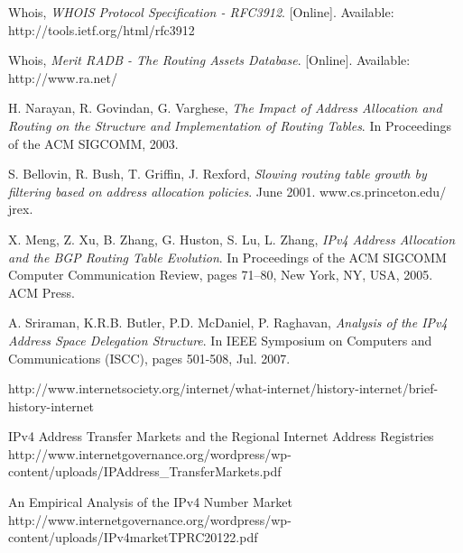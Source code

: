 \documentclass[11pt,a4paper]{scrreprt}
\begin{document}
\begin{thebibliography}{count}
	Whois,
	\emph{WHOIS Protocol Specification - RFC3912}.
	[Online]. Available: http://tools.ietf.org/html/rfc3912

	Whois,
	\emph{Merit RADB - The Routing Assets Database}.
	[Online]. Available: http://www.ra.net/

	H. Narayan, R. Govindan, G. Varghese,
	\emph{The Impact of Address Allocation and Routing on the Structure and Implementation of Routing Tables}.
	In Proceedings of the ACM SIGCOMM, 2003.
	
	S. Bellovin, R. Bush, T. Griffin, J. Rexford,
	\emph{Slowing routing table growth by filtering based on address allocation policies}.
	June 2001. www.cs.princeton.edu/ jrex.

	X. Meng, Z. Xu, B. Zhang, G. Huston, S. Lu, L. Zhang,
	\emph{IPv4 Address Allocation and the BGP Routing Table Evolution}.
	In Proceedings of the ACM SIGCOMM Computer Communication Review, pages 71–80, New York, NY, USA, 2005. ACM Press.

	A. Sriraman, K.R.B. Butler, P.D. McDaniel, P. Raghavan,
	\emph{Analysis of the IPv4 Address Space Delegation Structure}.
	In IEEE Symposium on Computers and Communications (ISCC), pages 501-508, Jul. 2007.
	
	http://www.internetsociety.org/internet/what-internet/history-internet/brief-history-internet
	
	IPv4 Address Transfer Markets and the Regional Internet Address Registries http://www.internetgovernance.org/wordpress/wp-content/uploads/IPAddress\_TransferMarkets.pdf
	
	An Empirical Analysis of the IPv4 Number Market http://www.internetgovernance.org/wordpress/wp-content/uploads/IPv4marketTPRC20122.pdf
	
\end{thebibliography}	
\end{document}

